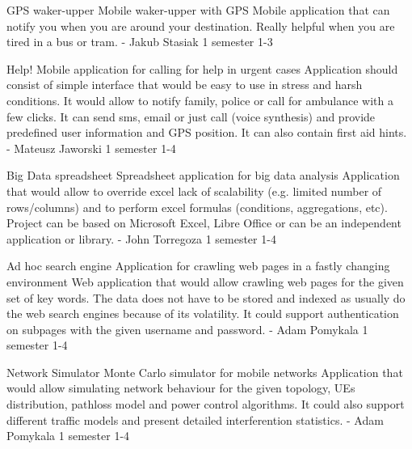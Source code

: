 \begin{project}
{GPS waker-upper}
{Mobile waker-upper with GPS}
{
Mobile application that can notify you when you are around your destination.
Really helpful when you are tired in a bus or tram.
}
{-}
{Jakub Stasiak}
{1 semester}
{1-3}
\end{project}
\begin{project}
{Help!}
{Mobile application for calling for help in urgent cases} 
{ 
Application should consist of simple interface that would be easy to use in
stress and harsh conditions. It would allow to notify family, police or call for
ambulance with a few clicks. It can send sms, email or just call (voice
synthesis) and provide predefined user information and GPS position. It can also
contain first aid hints.
} {-}
{Mateusz Jaworski} {1 semester} {1-4}
\end{project}
\begin{project}
{Big Data spreadsheet}
{Spreadsheet application for big data analysis} 
{ 
Application that would allow to override excel lack of scalability (e.g. limited
number of rows/columns) and to perform excel formulas (conditions, aggregations,
etc). Project can be based on Microsoft Excel, Libre Office or can be an
independent application or library.
} 
{-}
{John Torregoza}
{1 semester}
{1-4}
\end{project}
\begin{project}
{Ad hoc search engine}
{Application for crawling web pages in a fastly changing environment} 
{ 
Web application that would allow crawling web pages for the given set of
key words. The data does not have to be stored and indexed as usually do the web
search engines because of its volatility. It could support authentication on
subpages with the given username and password.
}
{-}
{Adam Pomykala}
{1 semester}
{1-4}
\end{project}
\begin{project}
{Network Simulator}
{Monte Carlo simulator for mobile networks} 
{ 
Application that would allow simulating network behaviour for the given
topology, UEs distribution, pathloss model and power control algorithms. It
could also support different traffic models and present detailed interferention
statistics.
} 
{-}
{Adam Pomykala}
{1 semester}
{1-4}
\end{project}

